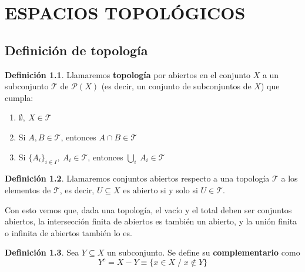 \documentclass[12pt,twoside]{report}
\newcommand\mc[1]{\mathcal{#1}}
\theoremstyle{azul}
\theoremstyle{azul2}
\theoremstyle{plain}
\theoremstyle{definition}
\newtheorem*{defi}{Definición}
\theoremstyle{remark}
\begin{document}
\chapter{ESPACIOS TOPOLÓGICOS}
\section{Definición de topología}
\begin{defi} \label{def:abierto}
Llamaremos \textbf{topología} por abiertos en el conjunto $X$ a un subconjunto $\mc{T}$ de $\mathcal{P}(X)$ (es decir, un conjunto de subconjuntos de $X$) que cumpla:
\begin{enumerate}
    \item $\emptyset, \: X \in \mc{T}$
    \item Si $A,B \in \mc{T}$, entonces $A \cap B \in \mc{T}$
    \item Si $\{ A_i \}_{i \in I}, \: A_i \in \mc{T}$, entonces $\underset{i}\bigcup \: A_i \in \mc{T}$
\end{enumerate}
\end{defi}

\begin{defi}
Llamaremos conjuntos abiertos respecto a una topología $\mc{T}$ a los elementos de $\mc{T}$, es decir, $U \subseteq X \text{ es abierto} $ si y solo si $ U \in \mc T$.
\end{defi}

Con esto vemos que, dada una topología, el vacío y el total deben ser conjuntos abiertos, la intersección finita de abiertos es también un abierto, y la unión finita o infinita de abiertos también lo es.

\begin{defi}
Sea $Y \subseteq X$ un subconjunto. Se define su \textbf{complementario} como $$Y^c = X - Y \equiv \{x \in X \; / \; x \nin Y\}$$
\end{defi}
\end{document}
